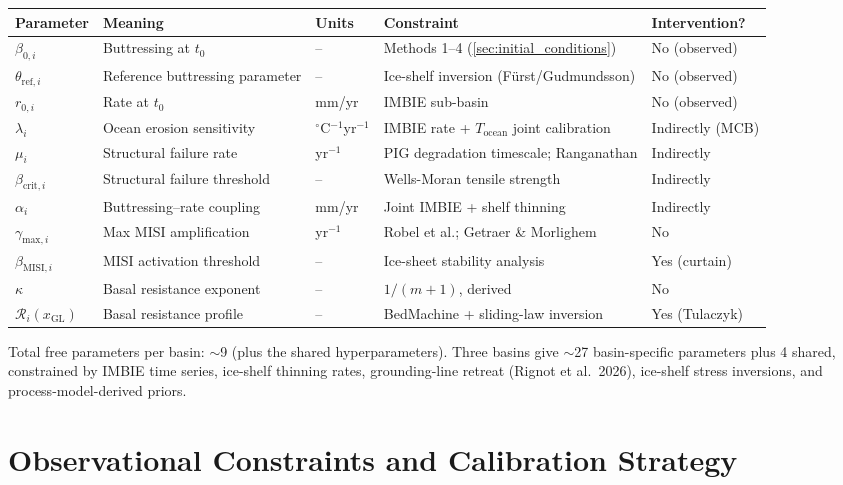 \documentclass[11pt]{article}
\theoremstyle{definition}
\begin{document}
\begin{center}
\footnotesize
\begin{tabular}{lllll}
  \toprule
  \textbf{Parameter} & \textbf{Meaning} & \textbf{Units} & \textbf{Constraint} & \textbf{Intervention?} \\
  \midrule
  $\beta_{0,i}$ & Buttressing at $t_0$ & -- & Methods 1--4 (\cref{sec:initial_conditions}) & No (observed) \\
  $\theta_{\text{ref},i}$ & Reference buttressing parameter & -- & Ice-shelf inversion (F\"{u}rst/Gudmundsson) & No (observed) \\
  $r_{0,i}$ & Rate at $t_0$ & mm/yr & IMBIE sub-basin & No (observed) \\
  $\lambda_i$ & Ocean erosion sensitivity & ${}^\circ$C$^{-1}$yr$^{-1}$ & IMBIE rate + $T_{\text{ocean}}$ joint calibration & Indirectly (MCB) \\
  $\mu_i$ & Structural failure rate & yr$^{-1}$ & PIG degradation timescale; Ranganathan & Indirectly \\
  $\beta_{\text{crit},i}$ & Structural failure threshold & -- & Wells-Moran tensile strength & Indirectly \\
  $\alpha_i$ & Buttressing--rate coupling & mm/yr & Joint IMBIE + shelf thinning & Indirectly \\
  $\gamma_{\text{max},i}$ & Max MISI amplification & yr$^{-1}$ & Robel et al.; Getraer \& Morlighem & No \\
  $\beta_{\text{MISI},i}$ & MISI activation threshold & -- & Ice-sheet stability analysis & Yes (curtain) \\
  $\kappa$ & Basal resistance exponent & -- & $1/(m+1)$, derived & No \\
  $\mathcal{R}_i(x_\text{GL})$ & Basal resistance profile & -- & BedMachine + sliding-law inversion & Yes (Tulaczyk) \\
  \bottomrule
\end{tabular}
\end{center}

Total free parameters per basin: $\sim$9 (plus the shared hyperparameters).  Three basins give $\sim$27 basin-specific parameters plus 4 shared, constrained by IMBIE time series, ice-shelf thinning rates, grounding-line retreat (Rignot et al.\ 2026), ice-shelf stress inversions, and process-model-derived priors.


\section{Observational Constraints and Calibration Strategy}
\label{sec:calibration}
\end{document}
